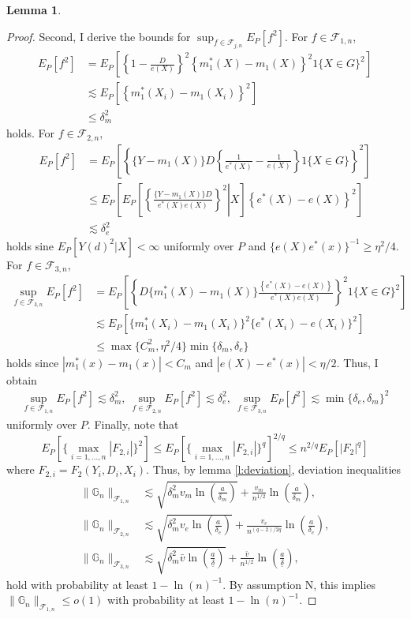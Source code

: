 \documentclass[12pt,oneside,reqno,english]{amsart}
\theoremstyle{definition}
\newtheorem{lemma}{Lemma}
\begin{document}
\begin{lemma}
\begin{proof}
Second, I derive the bounds for $\sup_{f\in \mathcal{F}_{j,n}}E_{P}[f^{2}]$. 
For $f\in \mathcal{F}_{1,n}$, 
\begin{align*}
E_{P}[f^{2}]&=E_{P}\left[\left\{1-\frac{D}{e(X)}\right\}^{2}\left\{m^{*}_{1}(X)-m_{1}(X)\right\}^{2}1\{X\in G\}^{2}\right]\\
&\lesssim E_{P}[\left\{m^{*}_{1}(X_{i})-m_{1}(X_{i})\right\}^{2}]\\
&\leq \delta_{m}^{2}
\end{align*}
holds. For $f\in \mathcal{F}_{2,n}$, 
\begin{align*}
E_{P}[f^{2}]&=E_{P}\left[\left\{\{Y-m_{1}(X)\}D\left\{\frac{1}{e^{*}(X)}-\frac{1}{e(X)}\right\}1\{X\in G\}\right\}^{2}\right]\\
&\leq E_{P}\left[\left. E_{P}\left[\left\{ \frac{\{Y-m_{1}(X)\}D}{e^{*}(X)e(X)}\right\}^{2}\right| X \right]\left\{e^{*}(X)-e(X)\right\}^{2}\right]\\
&\lesssim \delta_{e}^{2}
\end{align*}
holds sine $E_{P}[Y(d)^{2}|X]<\infty$ uniformly over $P$ and $\{e(X)e^{*}(x)\}^{-1}\geq \eta^{2}/4$.
For $f\in \mathcal{F}_{3,n}$,
\begin{align*}
\sup_{f\in \mathcal{F}_{3,n}}E_{P}[f^{2}] &=E_{P}\left[\left\{D\{m_{1}^{*}(X)-m_{1}(X)\}\frac{\left\{e^{*}(X)-e(X)\right\}}{e^{*}(X)e(X)}\right\}^{2}1\{X\in G\}^{2}\right]\\
&\lesssim E_{P}[\{m_{1}^{*}(X_{i})-m_{1}(X_{i})\}^{2}\{e^{*}(X_{i})-e(X_{i})\}^{2}]\\
&\leq \max\{C_{m}^{2},\eta^{2}/4\}\min\{\delta_{m},\delta_{e}\}
\end{align*}
holds since $|m_{1}^{*}(x)-m_{1}(x)|<C_{m}$ and $|e(X)-e^{*}(x)|< \eta/2$. 
Thus, I obtain 
\begin{align*}
\sup_{f\in \mathcal{F}_{1,n}}E_{P}[f^{2}]\lesssim \delta_{m}^{2},\ \sup_{f\in \mathcal{F}_{2,n}}E_{P}[f^{2}]\lesssim \delta_{e}^{2},\ \sup_{f\in \mathcal{F}_{3,n}}E_{P}[f^{2}]\lesssim \min\{\delta_{e},\delta_{m}\}^{2}
\end{align*}
uniformly over $P$. Finally, note that 
\[E_{P}[\{\max_{i=1,\ldots,n}|F_{2,i}|\}^{2}]\leq E_{P}[\{\max_{i=1,\ldots,n}|F_{2,i}|\}^{q}]^{2/q}\leq n^{2/q}E_{P}[|F_{2}|^{q}]\]
where $F_{2,i}=F_{2}(Y_{i},D_{i},X_{i})$.
Thus, by lemma \ref{l:deviation}, deviation inequalities 
\begin{align*}
\|\mathbb{G}_{n}\|_{\mathcal{F}_{1,n}}&\lesssim
 \sqrt{ \delta_{m}^{2} v_{m}\ln\left(\frac{a}{ \delta_{m}}\right)}+\frac{v_{m}}{n^{1/2}}\ln\left(\frac{a}{ \delta_{m}}\right), \\ 
\|\mathbb{G}_{n}\|_{\mathcal{F}_{2,n}}&\lesssim
 \sqrt{ \delta_{m}^{2} v_{e}\ln\left(\frac{a}{ \delta_{e}}\right)}+\frac{v_{e}}{n^{(q-2)/2q}}\ln\left(\frac{a}{ \delta_{e}}\right),\\
 \|\mathbb{G}_{n}\|_{\mathcal{F}_{3,n}}&\lesssim
 \sqrt{ \delta_{m}^{2} \bar{v}\ln\left(\frac{a}{\underline{\delta}}\right)}+\frac{\bar{v}}{n^{1/2}}\ln\left(\frac{a}{\underline{\delta}}\right), 
\end{align*}
hold with probability at least $1-\ln(n)^{-1}$. By assumption N, this implies $\|\mathbb{G}_{n}\|_{\mathcal{F}_{1,n}}\leq o(1)$ with probability at least $1-\ln(n)^{-1}$.


\end{proof}
\end{lemma}
\end{document}
